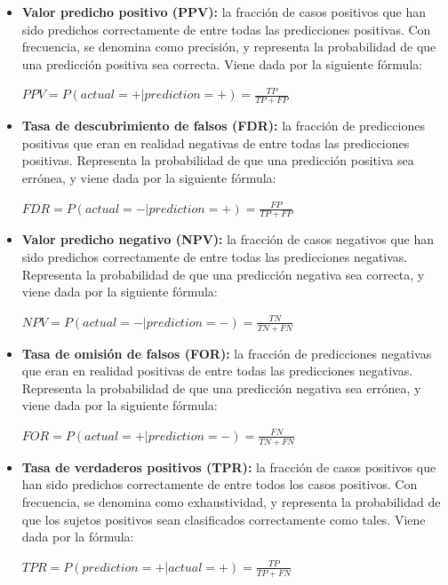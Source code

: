 \documentclass[runningheads,a4paper]{llncs}
\begin{document}
\begin{itemize}
   \item {\bf Valor predicho positivo (PPV):} la fracci\'on de casos positivos que han sido predichos correctamente de entre todas las predicciones positivas. Con frecuencia, se denomina como precisi\'on, y representa la probabilidad de que una predicci\'on positiva sea correcta. Viene dada por la siguiente f\'ormula:

${\displaystyle PPV=P(actual=+|prediction=+)={\frac {TP}{TP+FP}}}$\\

   \item {\bf Tasa de descubrimiento de falsos (FDR):} la fracci\'on de predicciones positivas que eran en realidad negativas de entre todas las predicciones positivas. Representa la probabilidad de que una predicci\'on positiva sea err\'onea, y viene dada por la siguiente f\'ormula:

${\displaystyle FDR=P(actual=-|prediction=+)={\frac {FP}{TP+FP}}}$\\

   \item {\bf Valor predicho negativo (NPV):} la fracci\'on de casos negativos que han sido predichos correctamente de entre todas las predicciones negativas. Representa la probabilidad de que una predicci\'on negativa sea correcta, y viene dada por la siguiente f\'ormula:

${\displaystyle NPV=P(actual=-|prediction=-)={\frac {TN}{TN+FN}}}$\\

    \item {\bf Tasa de omisión de falsos (FOR):} la fracci\'on de predicciones negativas que eran en realidad positivas de entre todas las predicciones negativas. Representa la probabilidad de que una predicci\'on negativa sea err\'onea, y viene dada por la siguiente f\'ormula:

${\displaystyle FOR=P(actual=+|prediction=-)={\frac {FN}{TN+FN}}}$\\

    \item {\bf Tasa de verdaderos positivos (TPR):} la fracci\'on de casos positivos que han sido predichos correctamente de entre todos los casos positivos. Con frecuencia, se denomina como exhaustividad, y representa la probabilidad de que los sujetos positivos sean clasificados correctamente como tales. Viene dada por la f\'ormula:

${\displaystyle TPR=P(prediction=+|actual=+)={\frac {TP}{TP+FN}}}$\\


\end{itemize}
\end{document}
